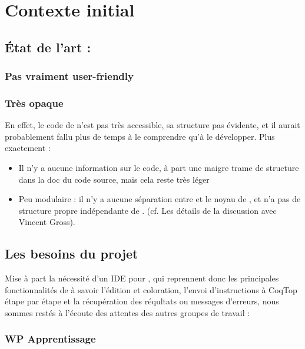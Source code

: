 \section{Contexte initial}

\subsection{État de l'art : \CoqIde{}}

\subsubsection{Pas vraiment user-friendly}


\subsubsection{Très opaque}

En effet, le code de \CoqIde{} n'est pas très accessible, sa structure pas évidente, et il aurait probablement fallu plus de temps à le comprendre qu'à le développer. Plus exactement :

\begin{itemize}
  \item Il n'y a aucune information sur le code, à part une maigre trame de structure dans la doc du code source, mais cela reste très léger
  \item Peu modulaire : il n'y a aucune séparation entre \CoqIde{} et le noyau de \Coq{}, et \CoqIde{} n'a pas de structure propre indépendante de \Coq{}. (cf. Les détails de la discussion avec Vincent Gross).
\end{itemize}
    
\subsection{Les besoins du projet \coquille}

Mise à part la nécessité d'un IDE pour \Coq{}, qui reprennent donc les principales fonctionnalités de \CoqIde{} à savoir l'édition et coloration, l'envoi d'instructions à CoqTop étape par étape et la récupération des réqultats ou messages d'erreurs, nous sommes restés à l'écoute des attentes des autres groupes de travail :

\subsubsection{WP Apprentissage}

